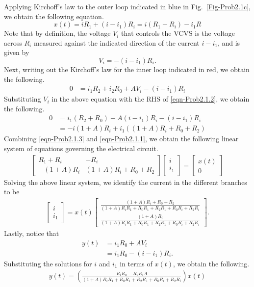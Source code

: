 \begin{excersizelist}
\begin{solution}
Applying Kirchoff's law to the outer loop indicated in blue in Fig.~\ref{Fig-Prob2.1c}, we obtain the following equation.
\begin{equation}
x(t) = iR_1+(i-i_1)R_i = i(R_1+R_i) - i_1 R \label{eqn-Prob2.1.1}
\end{equation}
Note that by definition, the voltage $V_i$ that controls the VCVS is the voltage across $R_i$ measured against the indicated direction of the current $i-i_1$, and is given by
\begin{equation}
V_i = -(i-i_1)R_i. \label{eqn-Prob2.1.2}
\end{equation}
Next, writing out the Kirchoff's law for the inner loop indicated in red, we obtain the following.
\begin{align}
0 &= i_1 R_2 + i_2 R_0 + AV_i - (i-i_1) R_i
\end{align}
Substituting $V_i$ in the above equation with the RHS of \eqref{eqn-Prob2.1.2}, we obtain the following.
\begin{align}
0&= i_1 (R_2+R_0) - A(i-i_1)R_i-(i-i_1)R_i\\
&= -i(1+A)R_i+i_1((1+A)R_i+R_0+R_2)\label{eqn-Prob2.1.3}
\end{align}
Combining \eqref{eqn-Prob2.1.3} and \eqref{eqn-Prob2.1.1}, we obtain the following linear system of equations governing the electrical circuit.
\begin{align}
\left[\begin{array}{cc} R_1+R_i &  -R_i\\ -(1+A)R_i & (1+A)R_i+R_0+R_2\end{array}\right]\left[\begin{array}{c} i\\ i_1\end{array}\right] = \left[\begin{array}{c} x(t)\\ 0\end{array}\right]
\end{align}
Solving the above linear system, we identify the current in the different branches to be
\begin{align}
\left[\begin{array}{c} i\\ i_1\end{array}\right] = x(t)\left[\begin{array}{c} \frac{ (1+A)R_i+R_0+R_2}{(1+A) R_iR_1+R_0R_1+R_2R_1+R_0R_i+R_2R_i}\\ \frac{(1+A)R_i}{(1+A) R_iR_1+R_0R_1+R_2R_1+R_0R_i+R_2R_i}\end{array}\right].\label{eqn-Prob2.1.4}
\end{align}
Lastly, notice that
\begin{align}
y(t) &= i_1 R_0 + A V_i \\
 & = i_1 R_0 - (i-i_1)R_i.
\end{align}
Substituting the solutions for $i$ and $i_1$ in terms of $x(t)$, we obtain the following.
\begin{align}
y(t)= \left( \frac{R_iR_0 - R_2R_iA}{(1+A) R_iR_1+R_0R_1+R_2R_1+R_0R_i+R_2R_i} \right)x(t)
\end{align}



\end{solution}
\end{excersizelist}
